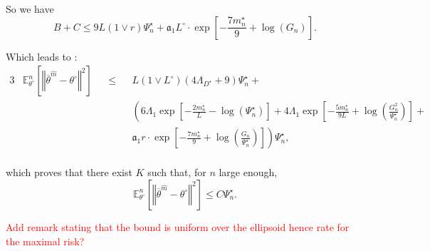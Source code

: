 \medskip

So we have
\[B + C \leq 9 L \left(1 \vee r \right) \Psi_{n}^{\star} + \mathfrak{a}_{1} L^{\circ} \cdot \exp\left[-\frac{7 m_{n}^{\star}}{9} + \log\left(G_{n}\right)\right].\]

\bigskip

Which leads to :
\begin{alignat*}{3}
& \mathds{E}_{\theta^{\circ}}^{n}\left[\left\Vert \overline{\theta}^{\widehat{m}} - \theta^{\circ} \right\Vert^{2}\right] && \leq && L \left( 1 \vee L^{\circ} \right) \left( 4 \Lambda_{D^{\star}} + 9\right) \Psi_{n}^{\star} +\\
& && && \left(6 \Lambda_{1} \exp\left[- \frac{2 m_{n}^{\star}}{L} - \log\left(\Psi_{n}^{\star}\right)\right] + 4 \Lambda_{1} \exp\left[-\frac{5 m_{n}^{\star}}{9 L} + \log \left(\frac{G_{n}^{2}}{\Psi_{n}^{\star}}\right)\right] + \right.\\
& && && \left.\mathfrak{a}_{1} r \cdot \exp\left[-\frac{7 m_{n}^{\star}}{9} + \log\left(\frac{G_{n}}{\Psi_{n}^{\star}}\right)\right]\right) \Psi_{n}^{\star},\\
\end{alignat*}

which proves that there exist $K$ such that, for $n$ large enough,
\[\mathds{E}_{\theta^{\circ}}^{n}\left[\left\Vert \overline{\theta}^{\widehat{m}} - \theta^{\circ} \right\Vert^{2}\right] \leq C \Psi_{n}^{\star}.\]

\textcolor{red}{Add remark stating that the bound is uniform over the ellipsoid hence rate for the maximal risk?}